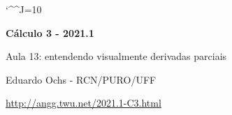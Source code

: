 \documentclass[oneside,12pt]{article}
\begin{document}
\catcode`\^^J=10

\pu

%
%

\def\drafturl{http://angg.twu.net/LATEX/2021-1-C3.pdf}
\def\drafturl{http://angg.twu.net/2021.1-C3.html}
\def\draftfooter{\tiny \href{\drafturl}{\jobname{}} \ColorBrown{\shorttoday{} \hours}}



%

\thispagestyle{empty}

\begin{center}

\vspace*{1.2cm}

{\bf \Large Cálculo 3 - 2021.1}

\bsk

Aula 13: entendendo visualmente derivadas parciais

\bsk

Eduardo Ochs - RCN/PURO/UFF

\url{http://angg.twu.net/2021.1-C3.html}

\end{center}
\end{document}
